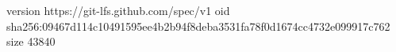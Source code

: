 version https://git-lfs.github.com/spec/v1
oid sha256:09467d114c10491595ee4b2b94f8deba3531fa78f0d1674cc4732e099917c762
size 43840
